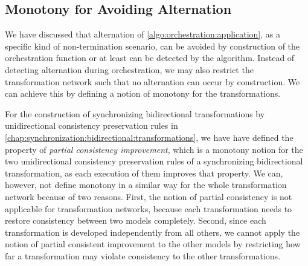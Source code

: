 

\subsection{Monotony for Avoiding Alternation}

We have discussed %
that alternation of \autoref{algo:orchestration:application}, as a specific kind of non-termination scenario, can be avoided by construction of the orchestration function or at least can be detected by the  algorithm.
Instead of detecting alternation during orchestration, we may also restrict the transformation network such that no alternation can occur by construction.
We can achieve this by defining a notion of monotony for the transformations.

For the construction of synchronizing bidirectional transformations by unidirectional consistency preservation rules in \autoref{chap:synchronization:bidirectional:transformations}, we have have defined the property of \emph{partial consistency improvement}, which is a monotony notion for the two unidirectional consistency preservation rules of a synchronizing bidirectional transformation, as each execution of them improves that property.
We can, however, not define monotony in a similar way for the whole transformation network because of two reasons.
First, the notion of partial consistency is not applicable for transformation networks, because each transformation needs to restore consistency between two models completely.
Second, since each transformation is developed independently from all others, we cannot apply the notion of partial consistent improvement to the other models by restricting how far a transformation may violate consistency to the other transformations.

